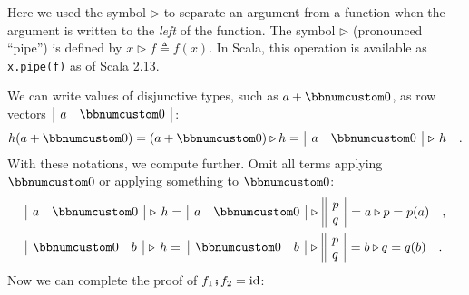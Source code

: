 Here we used the symbol $\triangleright$ to separate an argument
from a function when the argument is written to the \emph{left} of
the function. The symbol $\triangleright$ (pronounced \textsf{``}pipe\textsf{''})
is defined by $x\triangleright f\triangleq f(x)$. In Scala, this
operation is available as \lstinline!x.pipe(f)! as of Scala 2.13.

We can write values of disjunctive types, such as $a+\bbnum 0$, as
row vectors $\,\begin{array}{|cc|}
a & \bbnum 0\end{array}\,$:
\begin{equation}
h(a+\bbnum 0)=(a+\bbnum 0)\triangleright h=\,\begin{array}{|cc|}
a & \bbnum 0\end{array}\,\triangleright\,h\quad.\label{eq:forward-notation-}
\end{equation}
With these notations, we compute further. Omit all terms applying
$\bbnum 0$ or applying something to $\bbnum 0$:
\begin{align*}
 & \begin{array}{|cc|}
a & \bbnum 0\end{array}\,\triangleright\,h=\,\begin{array}{|cc|}
a & \bbnum 0\end{array}\,\triangleright\,\begin{array}{||c|}
p\\
q
\end{array}\,=a\triangleright p=p(a)\quad,\\
 & \begin{array}{|cc|}
\bbnum 0 & b\end{array}\,\triangleright\,h=\,\,\begin{array}{|cc|}
\bbnum 0 & b\end{array}\,\triangleright\,\begin{array}{||c|}
p\\
q
\end{array}\,=b\triangleright q=q(b)\quad.
\end{align*}
Now we can complete the proof of $f_{1}\bef f_{2}=\text{id}$:
